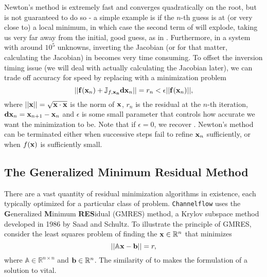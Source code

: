 Newton's method is extremely fast and converges quadratically on the root, but is not guaranteed to do so - a simple example is if the $n$-th guess is at (or very close to) a local minimum, in which case the second term of  will explode, taking us very far away from the initial, good guess, as in . Furthermore, in a system with around $10^5$ unknowns, inverting the Jacobian (or for that matter, calculating the Jacobian) in  becomes very time consuming. To offset the inversion timing issue (we will deal with actually calculating the Jacobian later), we can trade off accuracy for speed by replacing    with a minimization problem
\begin{equation}\label{eq:minimizeNewt}
||\mathbf{f}(\mathbf{x}_n) + \mathbb{J}_{f,\mathbf{x_n}}\mathbf{dx}_n|| = r_n< \epsilon ||\mathbf{f}(\mathbf{x}_n)||,
\end{equation}
where $||\mathbf{x}|| = \sqrt{\mathbf{x} \cdot \mathbf{x}}$ is the norm of $\mathbf{x}$, $r_n$ is the residual at the $n$-th iteration, $\mathbf{dx}_n = \mathbf{x}_{n+1} - \mathbf{x}_n$ and $\epsilon$ is some small parameter that controls how accurate we want the minimization to be. Note that if $\epsilon = 0$, we recover . Newton's method can be terminated either when successive steps fail to refine $\mathbf{x}_n$ sufficiently, or when $f(\mathbf{x})$ is sufficiently small.

\subsection{The Generalized Minimum Residual Method}

There are a vast quantity of residual minimization algorithms in existence, each typically optimized for a particular class of problem. {\tt Channelflow} uses the {\bf G}eneralized {\bf M}inimum {\bf RES}idual (GMRES) method, a Krylov subspace method developed in 1986 by Saad and Schultz. To illustrate the principle of GMRES, consider the least squares problem of finding the $\mathbf{x} \in \mathbb{R}^n$ that minimizes
\begin{equation}\label{eq:AXB}
||\mathbb{A}\mathbf{x} -\mathbf{b}|| = r,
\end{equation}
where $\mathbb{A} \in \mathbb{R}^{n\times n}$ and $\mathbf{b} \in \mathbb{R}^n$. The similarity of  to  makes the formulation of a solution to  vital. 
